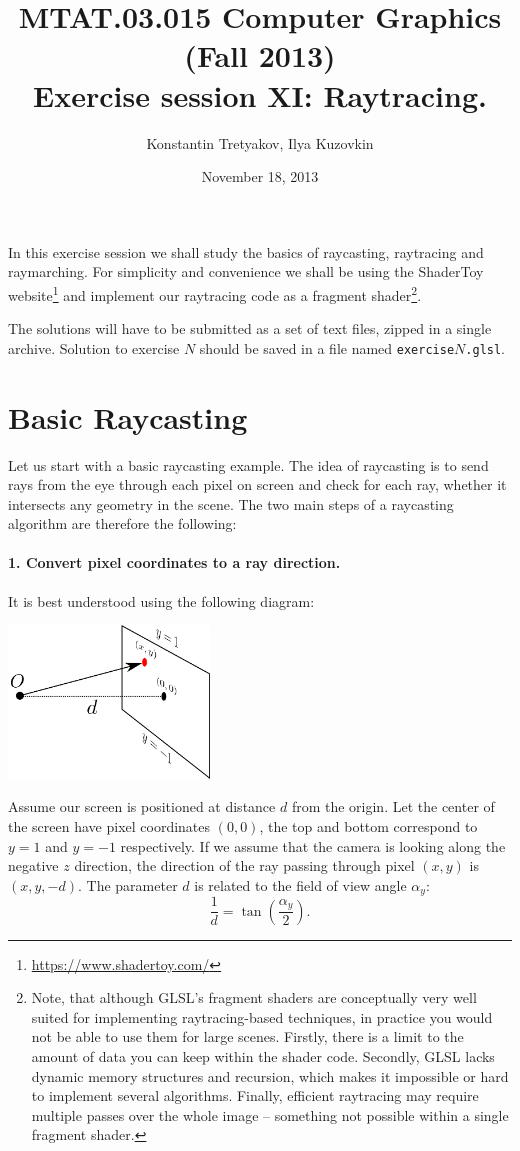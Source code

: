 \documentclass{article}
\begin{document}
\title{MTAT.03.015 Computer Graphics (Fall 2013)\\
Exercise session XI: Raytracing.}
\author{Konstantin Tretyakov, Ilya Kuzovkin}
\date{November 18, 2013}
\maketitle

In this exercise session we shall study the basics of raycasting, raytracing and raymarching. For simplicity and convenience we shall be using the ShaderToy website\footnote{\url{https://www.shadertoy.com/}} and implement our raytracing code as a fragment shader\footnote{Note, that although GLSL's fragment shaders are conceptually very well suited for implementing raytracing-based techniques, in practice you would not be able to use them for large scenes. Firstly, there is a limit to the amount of data you can keep within the shader code. Secondly, GLSL lacks dynamic memory structures and recursion, which makes it impossible or hard to implement several algorithms. Finally, efficient raytracing may require multiple passes over the whole image -- something not possible within a single fragment shader.}.

The solutions will have to be submitted as a set of text files, zipped in a single archive. Solution to exercise $N$ should be saved in a file named \texttt{exercise}$N$\texttt{.glsl}.

\section{Basic Raycasting}
Let us start with a basic raycasting example. The idea of raycasting is to send rays from the eye through each pixel on screen and check for each ray, whether it intersects any geometry in the scene. The two main steps of a raycasting algorithm are therefore the following:
\paragraph{1. Convert pixel coordinates to a ray direction.}
It is best understood using the following diagram:
\begin{center}
\includegraphics[width=0.4\textwidth]{fig1.png}
\end{center}
Assume our screen is positioned at distance $d$ from the origin. Let the center of the screen have pixel coordinates $(0, 0)$, the top and bottom correspond to $y=1$ and $y=-1$ respectively. If we assume that the camera is looking along the negative $z$ direction, the direction of the ray passing through pixel $(x,y)$ is $(x, y, -d)$. The parameter $d$ is related to the field of view angle $\alpha_y$:
$$\frac{1}{d} = \tan\left(\frac{\alpha_y}{2}\right).
$$
\end{document}

